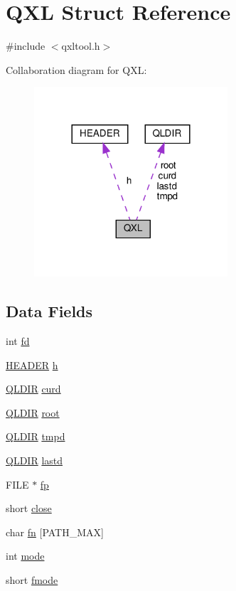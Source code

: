 \hypertarget{struct_q_x_l}{}\section{Q\+XL Struct Reference}
\label{struct_q_x_l}


{\ttfamily \#include $<$qxltool.\+h$>$}



Collaboration diagram for Q\+XL\+:\nopagebreak
\begin{figure}[H]
\begin{center}
\leavevmode
\includegraphics[width=204pt]{struct_q_x_l__coll__graph}
\end{center}
\end{figure}
\subsection*{Data Fields}
\begin{DoxyCompactItemize}
\item 
int \hyperlink{struct_q_x_l_a6f8059414f0228f0256115e024eeed4b}{fd}
\item 
\hyperlink{struct_h_e_a_d_e_r}{H\+E\+A\+D\+ER} \hyperlink{struct_q_x_l_a7599cc5310e4c5370ac2ff59a892244d}{h}
\item 
\hyperlink{struct_q_l_d_i_r}{Q\+L\+D\+IR} \hyperlink{struct_q_x_l_a6de489f08d735198d49d93db47ac17d3}{curd}
\item 
\hyperlink{struct_q_l_d_i_r}{Q\+L\+D\+IR} \hyperlink{struct_q_x_l_a375fb5f40df99977d121396f12103eac}{root}
\item 
\hyperlink{struct_q_l_d_i_r}{Q\+L\+D\+IR} \hyperlink{struct_q_x_l_aa73f3bee736003684c612c765173456b}{tmpd}
\item 
\hyperlink{struct_q_l_d_i_r}{Q\+L\+D\+IR} \hyperlink{struct_q_x_l_ac28f889bad43711b02d0d59d69976ded}{lastd}
\item 
F\+I\+LE $\ast$ \hyperlink{struct_q_x_l_aa065f30aa9f5f9a42132c82c787ee70b}{fp}
\item 
short \hyperlink{struct_q_x_l_ab6947e12da3463e7a671017f8804ebc8}{close}
\item 
char \hyperlink{struct_q_x_l_a7b855d6690caa0e60d0320cafd38051d}{fn} \mbox{[}P\+A\+T\+H\+\_\+\+M\+AX\mbox{]}
\item 
int \hyperlink{struct_q_x_l_a1ea5d0cb93f22f7d0fdf804bd68c3326}{mode}
\item 
short \hyperlink{struct_q_x_l_a1e2da7ce56bf4f62a21da3ea15b88805}{fmode}
\end{DoxyCompactItemize}


